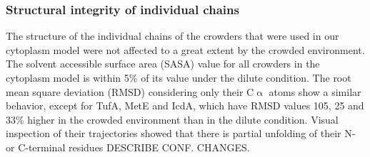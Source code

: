 \documentclass[journal=jacsat,manuscript=article]{achemso}
\begin{document}

\subsubsection{Structural integrity of individual chains}
The structure of the individual chains of the crowders that were used in our cytoplasm model were not affected to a great extent by the crowded environment. The solvent accessible surface area (SASA) value for all crowders in the cytoplasm model is within 5\% of its value under the dilute condition. The root mean square deviation (RMSD) considering only their C$\upalpha$ atoms show a similar behavior, except for TufA, MetE and IcdA, which have RMSD values 105, 25 and 33\% higher in the crowded environment than in the dilute condition. Visual inspection of their trajectories showed that there is partial unfolding of their N- or C-terminal residues \colorbox{red!50}{DESCRIBE CONF. CHANGES}.
\end{document}
